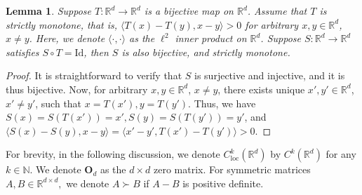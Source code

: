 \documentclass{article} %
\theoremstyle{plain}
\newtheorem{lemma}[theorem]{Lemma}
\theoremstyle{definition}
\theoremstyle{remark}
\begin{document}
\begin{lemma}\label{lemma:mono_map}
  Suppose $T:\mathbb{R}^d\rightarrow\mathbb{R}^d$ is a bijective map on $\mathbb{R}^d$. Assume that $T$ is strictly monotone, that is, $\langle T(x) - T(y), x-y \rangle > 0$ for arbitrary $x, y\in\mathbb{R}^d$, $x\neq y$. Here, we denote $\langle\cdot, \cdot \rangle$ as the $\ell^2$ inner product on $\mathbb{R}^d$. Suppose $S:\mathbb{R}^d\rightarrow \mathbb{R}^d$ satisfies $S\circ T = \mathrm{Id}$, then $S$ is also bijective, and strictly monotone.
\end{lemma}
\begin{proof}
  It is straightforward to verify that $S$ is surjective and injective, and it is thus bijective. Now, for arbitrary $x, y\in\mathbb{R}^d$, $x\neq y$, there exists unique $x',y'\in\mathbb{R}^d$, $x'\neq y'$, such that $x=T(x'), y=T(y')$. Thus, we have $S(x)=S(T(x'))=x', S(y)=S(T(y'))=y'$, and $\langle S(x)-S(y), x-y  \rangle = \langle x'-y', T(x')-T(y')\rangle>0.$
\end{proof}

For brevity, in the following discussion, we denote \( C^k_{\mathrm{loc}}(\mathbb{R}^d) \) by \( C^k(\mathbb{R}^d) \) for any \( k \in \mathbb{N} \). We denote $\textbf{O}_d$ as the $d\times d$ zero matrix. For symmetric matrices $A, B\in\mathbb{R}^{d\times d},$ we denote $A\succ B$ if $A-B$ is positive definite.
\end{document}
